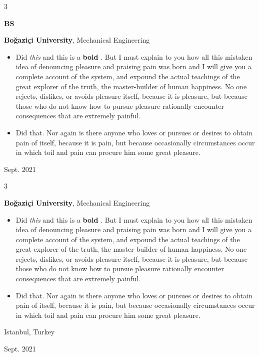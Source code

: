 \documentclass[10pt, letterpaper]{article}
\newenvironment{highlights}{
    \begin{itemize}[
        topsep=0.10 cm,
        parsep=0.10 cm,
        partopsep=0pt,
        itemsep=0pt,
        leftmargin=0.4 cm + 10pt
    ]
}{
    \end{itemize}
} %
\newenvironment{threecolentry}[3][]{
    \onecolentry
    \def\thirdColumn{#3}
    \setcolumnwidth{1 cm, \fill, 4.5 cm}
    \begin{paracol}{3}
    {\raggedright #2} \switchcolumn
}{
    \switchcolumn \raggedleft \thirdColumn
    \end{paracol}
    \endonecolentry
} %
\let\hrefWithoutArrow\href
\renewcommand{\href}[2]{\hrefWithoutArrow{#1}{\mbox{\ifthenelse{\equal{#2}{}}{ }{#2 }\raisebox{.15ex}{\footnotesize \faExternalLink*}}}}
\begin{document}
        \vspace{0.2 cm}

        \begin{threecolentry}{\textbf{BS}}{
            Sept. 2021
        }
            \textbf{Boğaziçi University}, Mechanical Engineering
            \begin{highlights}
                \item Did \textit{this} and this is a \textbf{bold} \href{https://example.com}{link}. But I must explain to you how all this mistaken idea of denouncing pleasure and praising pain was born and I will give you a complete account of the system, and expound the actual teachings of the great explorer of the truth, the master-builder of human happiness. No one rejects, dislikes, or avoids pleasure itself, because it is pleasure, but because those who do not know how to pursue pleasure rationally encounter consequences that are extremely painful.
                \item Did that. Nor again is there anyone who loves or pursues or desires to obtain pain of itself, because it is pain, but because occasionally circumstances occur in which toil and pain can procure him some great pleasure.
            \end{highlights}
        \end{threecolentry}

        \vspace{0.2 cm}

        \begin{threecolentry}{\textbf{}}{
            Istanbul, Turkey

        Sept. 2021
        }
            \textbf{Boğaziçi University}, Mechanical Engineering
            \begin{highlights}
                \item Did \textit{this} and this is a \textbf{bold} \href{https://example.com}{link}. But I must explain to you how all this mistaken idea of denouncing pleasure and praising pain was born and I will give you a complete account of the system, and expound the actual teachings of the great explorer of the truth, the master-builder of human happiness. No one rejects, dislikes, or avoids pleasure itself, because it is pleasure, but because those who do not know how to pursue pleasure rationally encounter consequences that are extremely painful.
                \item Did that. Nor again is there anyone who loves or pursues or desires to obtain pain of itself, because it is pain, but because occasionally circumstances occur in which toil and pain can procure him some great pleasure.
            \end{highlights}
        \end{threecolentry}
\end{document}
